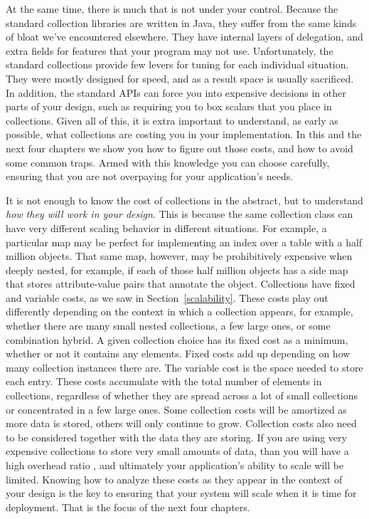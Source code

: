 At the same time, there is much that is not under your control.
Because the standard collection libraries are written in Java, they suffer from
the same kinds of bloat we've encountered elsewhere. They have internal layers
of delegation, and extra fields for features that your program may not
use. Unfortunately, the standard collections provide few levers for
tuning for each individual situation. They were
mostly designed for speed, and as a result space is usually sacrificed. In
addition, the standard APIs can force you into expensive decisions in other
parts of your design, such as requiring you to box scalars that you place in
collections. Given all of this, it is extra important to understand, as early as possible,
what collections are costing you in your implementation. In this and
the next four chapters we show you how to figure out those costs, and how
to avoid some common traps. Armed with this
knowledge you can choose carefully, ensuring that you are not
overpaying for your application's needs.

It is not enough to know the cost
of collections in the abstract, but to understand \emph{how they will work in
your design}. This is because the same collection class can have very different
scaling behavior in different situations. For example, a particular map
may be perfect for implementing an index over a table with a half
million objects. That same map, however, may be prohibitively expensive
when deeply nested, for example, if each of those half million objects has a
side map that stores attribute-value pairs that annotate the object.
Collections have fixed and variable costs, as we saw
in Section~\ref{scalability}. These costs play out differently
depending on the context in which a collection appears, for example, whether
there are many small nested collections, a few large ones, or some combination
hybrid.  A given collection choice has its fixed cost as a minimum,
whether or not it contains any elements. Fixed costs add up depending on how many collection instances there are. The variable cost is the space needed to store each entry. 
These costs accumulate with the total number of
elements in collections, regardless of whether they are spread across a lot of
small collections or concentrated in a few
large ones. 
Some collection costs will be amortized as more data is stored, others will only
continue to grow. Collection costs also need to be considered together with the data they are
storing. If you are using very expensive collections to store very small amounts of data, than you will have a high overhead ratio
, and ultimately your application's ability to scale will be limited. 
Knowing how to analyze these costs as they appear in the context of your design
is the key to ensuring that your system will scale when it is time for
deployment.  That is the focus of the next four chapters.

